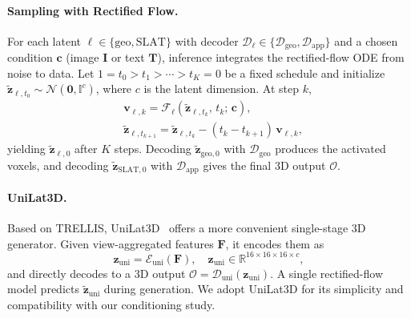 \paragraph{Sampling with Rectified Flow.}
For each latent $\ell \in \{\text{geo}, \text{SLAT}\}$ with decoder $\mathcal{D}_\ell \in \{\mathcal{D}_{\text{geo}}, \mathcal{D}_{\text{app}}\}$ and a chosen condition $\mathbf{c}$ (image $\mathbf{I}$ or text $\mathbf{T}$), inference integrates the rectified-flow ODE from noise to data. Let $1 = t_0 > t_1 > \cdots > t_K = 0$ be a fixed schedule and initialize
$\tilde{\mathbf{z}}_{\ell, t_0} \sim \mathcal{N}(\mathbf{0}, \mathbb{I}^{c})$, where $c$ is the latent dimension. At step $k$,
\begin{equation}
\begin{aligned}
        &\mathbf{v}_{\ell, k}
    = \mathcal{F}_{\ell}\!\left(\tilde{\mathbf{z}}_{\ell, t_k},\, t_k;\, \mathbf{c}\right),\\
    &\tilde{\mathbf{z}}_{\ell, t_{k+1}}
    = \tilde{\mathbf{z}}_{\ell, t_k}
      - (t_k - t_{k+1})\, \mathbf{v}_{\ell, k},
\end{aligned}
\end{equation}
yielding $\tilde{\mathbf{z}}_{\ell, 0}$ after $K$ steps.
Decoding $\tilde{\mathbf{z}}_{\text{geo}, 0}$ with $\mathcal{D}_{\text{geo}}$ produces the activated voxels, and decoding
$\tilde{\mathbf{z}}_{\text{SLAT}, 0}$ with $\mathcal{D}_{\text{app}}$ gives the final 3D output $\mathcal{O}$.

\paragraph{UniLat3D.} Based on TRELLIS, UniLat3D~\cite{unilat} offers a more convenient single-stage 3D generator. Given view-aggregated features $\mathbf{F}$, it encodes them as
\begin{equation}
    \mathbf{z}_{\text{uni}} = \mathcal{E}_{\text{uni}}(\mathbf{F}), \quad
    \mathbf{z}_{\text{uni}} \in \mathbb{R}^{16 \times 16 \times 16 \times c},
\end{equation}
and directly decodes to a 3D output $\mathcal{O} = \mathcal{D}_{\text{uni}}(\mathbf{z}_{\text{uni}})$.
A single rectified-flow model predicts $\tilde{\mathbf{z}}_{\text{uni}}$ during generation. We adopt UniLat3D for its simplicity and compatibility with our conditioning study.

